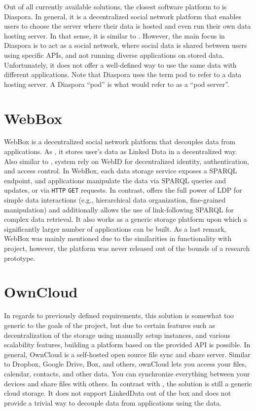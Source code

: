 Out of all currently available solutions, the closest software platform to \solid{} is Diaspora. In general, it is a decentralized social network platform that enables users to choose the server where their data is hosted and even run their own data hosting server. In that sense, it is similar to \solid{}. However, the main focus in Diaspora is to act as a social network, where social data is shared between users using specific APIs, and not running diverse applications on stored data. Unfortunately, it does not offer a well-defined way to use the same data with different applications. Note that Diaspora uses the term pod to refer to a data hosting server. A Diaspora “pod” is what \solid{} would refer to as a “pod server”.

\section{WebBox}

WebBox is a decentralized social network platform that decouples data from applications. As \solid{}, it stores user’s data as Linked Data in a decentralized way. Also similar to \solid{}, system rely on WebID for decentralized identity, authentication, and access control. In WebBox, each data storage service exposes a SPARQL endpoint, and applications manipulate the data via SPARQL queries and updates, or via \texttt{HTTP} \texttt{GET} requests. In contrast, \solid{} offers the full power of LDP for simple data interactions (e.g., hierarchical data organization, fine-grained manipulation) and additionally allows the use of link-following SPARQL for complex data retrieval. It also works as a generic storage platform upon which a significantly larger number of applications can be built. As a last remark, WebBox was mainly mentioned due to the similarities in functionality with \solid{} project, however, the platform was never released out of the bounds of a research prototype.

\section{OwnCloud}

In regards to previously defined requirements, this solution is somewhat too generic to the goals of the project, but due to certain features such as decentralization of the storage using manually setup instances, and various scalability features, building a platform based on the provided API is possible. In general, OwnCloud is a self-hosted open source file sync and share server. Similar to Dropbox, Google Drive, Box, and others, ownCloud lets you access your files, calendar, contacts, and other data. You can synchronize everything between your devices and share files with others. In contrast with \solid{}, the solution is still a generic cloud storage. It does not support LinkedData out of the box and does not provide a trivial way to decouple data from applications using the data. 

